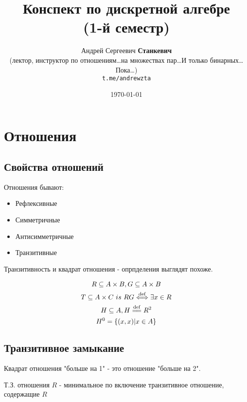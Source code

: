 \documentclass[a4paper, 12pt]{article}
\title{Конспект по дискретной алгебре \\(1-й семестр)}
\author{
  \vova
  \and
  Андрей Сергеевич \textbf{Станкевич} \\
  (лектор, инструктор по отношениям\dots на множествах пар\dots И только бинарных\dots Пока\dots) \\
  \texttt{t.me/andrewzta}
}
\date{\today}
\begin{document}
    \maketitle
    \newpage
    \tableofcontents
    \newpage


    \section{Отношения}

    \subsection{Свойства отношений}

    Отношения бывают:
    \begin{itemize}
        \item Рефлексивные
        \item Симметричные
        \item Антисимметричные
        \item Транзитивные
    \end{itemize}

    Транзитивность и квадрат отношения - опрпделения выглядят похоже.

    \begin{definition}
        \begin{gather}
            R \subseteq A \times B, G \subseteq A \times B\\
            T \subseteq A \times C ~ is ~ RG \isdef \exists x \in R \\
            H \subseteq A, H \eqdef R^2 \\
            H^0 = \{ (x, x) | x \in A \}
        \end{gather}
    \end{definition}
 
    
    \subsection{Транзитивное замыкание}

    \begin{note}
        Квадрат отношения "больше на 1" - это отношение "больше на 2".
    \end{note}

    \begin{definition}\nl
        Т.З. отношения $R$ - минимальное 
        по включение транзитивное отношение, содержащие $R$
    \end{definition}
\end{document}
